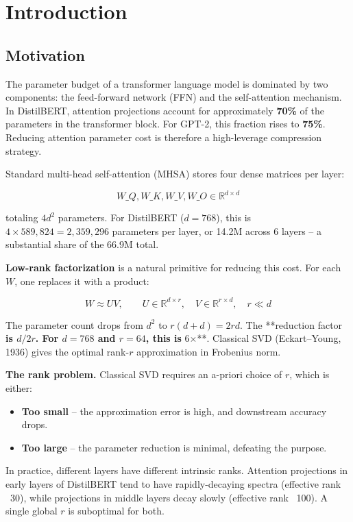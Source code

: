 
\section{Introduction}

\subsection{Motivation}

The parameter budget of a transformer language model is dominated by two 
components: the feed-forward network (FFN) and the self-attention mechanism. 
In DistilBERT, attention projections account for approximately \textbf{70\%} of the 
parameters in the transformer block. For GPT-2, this fraction rises to 
\textbf{75\%}. Reducing attention parameter cost is therefore a high-leverage 
compression strategy.

Standard multi-head self-attention (MHSA) stores four dense matrices per 
layer:

\[
W\_Q, W\_K, W\_V, W\_O \in \mathbb{R}^{d \times d}
\tag{1.1}
\]

totaling $4d^2$ parameters. For DistilBERT ($d = 768$), this is $4 \times 589{,}824 = 2{,}359{,}296$ 
parameters per layer, or 14.2M across 6 layers -- a substantial share of the 
66.9M total.

\textbf{Low-rank factorization} is a natural primitive for reducing this cost. 
For each $W$, one replaces it with a product:

\[
W \approx U V, \qquad
U \in \mathbb{R}^{d \times r}, \quad V \in \mathbb{R}^{r \times d}, \quad r \ll d
\tag{1.2}
\]

The parameter count drops from $d^2$ to $r(d + d) = 2rd$. The **reduction 
factor\textbf{ is $d / 2r$. For $d = 768$ and $r = 64$, this is }6$\times$**. Classical 
SVD (Eckart--Young, 1936) gives the optimal rank-$r$ approximation in 
Frobenius norm.

\textbf{The rank problem.} Classical SVD requires an a-priori choice of $r$, which 
is either:

\begin{itemize}
\item \textbf{Too small} -- the approximation error is high, and downstream accuracy
  drops.
\item \textbf{Too large} -- the parameter reduction is minimal, defeating the purpose.

\end{itemize}
In practice, different layers have different intrinsic ranks. Attention 
projections in early layers of DistilBERT tend to have rapidly-decaying 
spectra (effective rank ~30), while projections in middle layers decay 
slowly (effective rank ~100). A single global $r$ is suboptimal for both.

